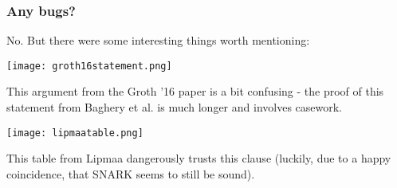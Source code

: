 \documentclass{beamer}
\begin{document}
\begin{frame}
    \frametitle{Any bugs?}

    No. But there were some interesting things worth mentioning:

    \begin{center}
        \texttt{[image: groth16statement.png]}        
    \end{center}
    
    This argument from the Groth '16 paper is a bit confusing - the proof of this statement from Baghery et al. is much longer and involves casework.

    \begin{center}
        \texttt{[image: lipmaatable.png]}        
    \end{center}

    This table from Lipmaa dangerously trusts this clause (luckily, due to a happy coincidence, that SNARK seems to still be sound).
    
\end{frame}



    
        
     



    





\end{document}
